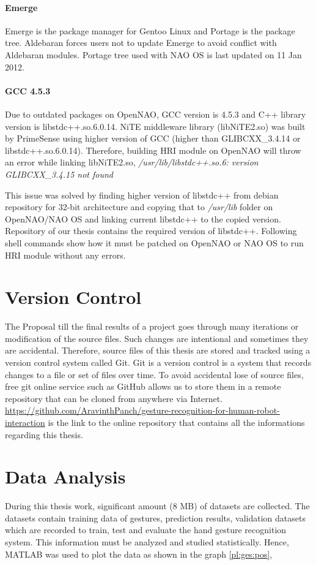 \paragraph*{Emerge} Emerge is the package manager for Gentoo Linux and Portage is the package tree. Aldebaran forces users not to update Emerge to avoid conflict with Aldebaran modules. Portage tree used with NAO OS is last updated on 11 Jan 2012. 

\paragraph*{GCC 4.5.3} Due to outdated packages on OpenNAO, GCC version is 4.5.3 and C++ library version is libstdc++.so.6.0.14. NiTE middleware library (libNiTE2.so) was built by PrimeSense using higher version of GCC (higher than GLIBCXX\_3.4.14 or libstdc++.so.6.0.14). Therefore, building HRI module on OpenNAO will throw an error while linking libNiTE2.so, \textit{/usr/lib/libstdc++.so.6: version GLIBCXX\_3.4.15 not found}

This issue was solved by finding higher version of libstdc++ from debian repository for 32-bit architecture and copying that to \textit{/usr/lib} folder on OpenNAO/NAO OS and linking current libstdc++ to the copied version. Repository of our thesis contains the required version of libstdc++. Following shell commands show how it must be patched on OpenNAO or NAO OS to run HRI module without any errors.



\section*{Version Control} The Proposal till the final results of a project goes through many iterations or modification of the source files. Such changes are intentional and sometimes they are accidental. Therefore, source files of this thesis are stored and tracked using a version control system called Git. Git is a version control is a system that records changes to a file or set of files over time. To avoid accidental lose of source files, free git online service such as GitHub allows us to store them in a remote repository that can be cloned from anywhere via Internet. \url{https://github.com/AravinthPanch/gesture-recognition-for-human-robot-interaction} is the link to the online repository that contains all the informations regarding this thesis.

\section*{Data Analysis} During this thesis work, significant amount (8 MB) of datasets are collected. The datasets contain training data of gestures, prediction results, validation datasets which are recorded to train, test and evaluate the hand gesture recognition system. This information must be analyzed and studied statistically. Hence,  MATLAB was used to plot the data as shown in the graph \ref{pl:ges:pos}, 
